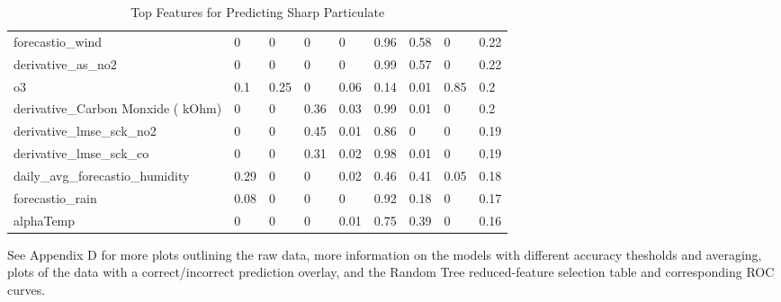 \begin{table}[]
\begin{tabular}{lllllllll}
forecastio\_wind                             & 0     & 0          & 0    & 0    & 0.96  & 0.58      & 0    & 0.22 \\
derivative\_as\_no2                          & 0     & 0          & 0    & 0    & 0.99  & 0.57      & 0    & 0.22 \\
o3                                           & 0.1   & 0.25       & 0    & 0.06 & 0.14  & 0.01      & 0.85 & 0.2  \\
derivative\_Carbon Monxide ( kOhm)           & 0     & 0          & 0.36 & 0.03 & 0.99  & 0.01      & 0    & 0.2  \\
derivative\_lmse\_sck\_no2                   & 0     & 0          & 0.45 & 0.01 & 0.86  & 0         & 0    & 0.19 \\
derivative\_lmse\_sck\_co                    & 0     & 0          & 0.31 & 0.02 & 0.98  & 0.01      & 0    & 0.19 \\
daily\_avg\_forecastio\_humidity             & 0.29  & 0          & 0    & 0.02 & 0.46  & 0.41      & 0.05 & 0.18 \\
forecastio\_rain                             & 0.08  & 0          & 0    & 0    & 0.92  & 0.18      & 0    & 0.17 \\
alphaTemp                                    & 0     & 0          & 0    & 0.01 & 0.75  & 0.39      & 0    & 0.16 \\
\bottomrule
\end{tabular}
\label{tab:sharp_top_features}
\caption{Top Features for Predicting Sharp Particulate}
\end{table}


See Appendix D for more plots outlining the raw data, more information on the models with different accuracy thesholds and averaging, plots of the data with a correct/incorrect prediction overlay, and the Random Tree reduced-feature selection table and corresponding ROC curves. 
